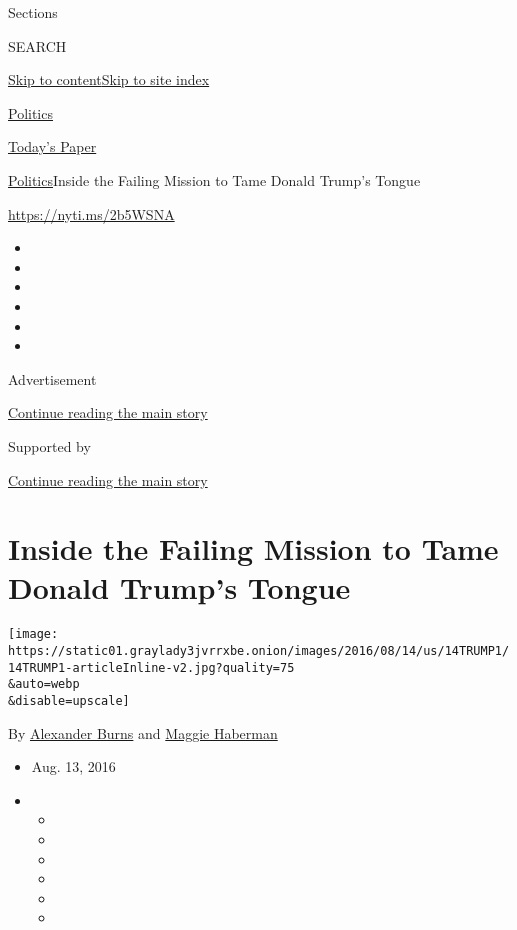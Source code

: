 Sections

SEARCH

\protect\hyperlink{site-content}{Skip to
content}\protect\hyperlink{site-index}{Skip to site index}

\href{https://www.nytimes3xbfgragh.onion/section/politics}{Politics}

\href{https://myaccount.nytimes3xbfgragh.onion/auth/login?response_type=cookie\&client_id=vi}{}

\href{https://www.nytimes3xbfgragh.onion/section/todayspaper}{Today's
Paper}

\href{/section/politics}{Politics}\textbar{}Inside the Failing Mission
to Tame Donald Trump's Tongue

\url{https://nyti.ms/2b5WSNA}

\begin{itemize}
\item
\item
\item
\item
\item
\item
\end{itemize}

Advertisement

\protect\hyperlink{after-top}{Continue reading the main story}

Supported by

\protect\hyperlink{after-sponsor}{Continue reading the main story}

\hypertarget{inside-the-failing-mission-to-tame-donald-trumps-tongue}{%
\section{Inside the Failing Mission to Tame Donald Trump's
Tongue}\label{inside-the-failing-mission-to-tame-donald-trumps-tongue}}

\texttt{[image: https://static01.graylady3jvrrxbe.onion/images/2016/08/14/us/14TRUMP1/14TRUMP1-articleInline-v2.jpg?quality=75\\\&auto=webp\\\&disable=upscale]}

By \href{http://www.nytimes3xbfgragh.onion/by/alexander-burns}{Alexander
Burns} and
\href{http://www.nytimes3xbfgragh.onion/by/maggie-haberman}{Maggie
Haberman}

\begin{itemize}
\item
  Aug. 13, 2016
\item
  \begin{itemize}
  \item
  \item
  \item
  \item
  \item
  \item
  \end{itemize}
\end{itemize}

